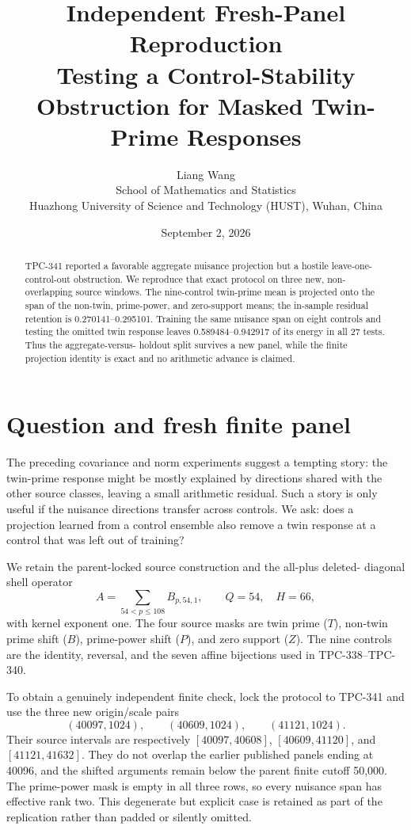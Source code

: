 \documentclass[10pt]{article}
\title{Independent Fresh-Panel Reproduction\\
\large Testing a Control-Stability Obstruction for Masked Twin-Prime Responses}
\author{Liang Wang\\School of Mathematics and Statistics\\
Huazhong University of Science and Technology (HUST), Wuhan, China}
\date{September 2, 2026}
\begin{document}
\maketitle

\begin{abstract}
TPC-341 reported a favorable aggregate nuisance projection but a hostile
leave-one-control-out obstruction.  We reproduce that exact protocol on three
new, non-overlapping source windows.  The nine-control twin-prime mean is
projected onto the span of the non-twin, prime-power, and zero-support means;
the in-sample residual retention is 0.270141--0.295101.  Training the same
nuisance span on eight controls and testing the omitted twin response leaves
0.589484--0.942917 of its energy in all 27 tests.  Thus the aggregate-versus-
holdout split survives a new panel, while the finite projection identity is
exact and no arithmetic advance is claimed.
\end{abstract}

\section{Question and fresh finite panel}

The preceding covariance and norm experiments suggest a tempting story: the
twin-prime response might be mostly explained by directions shared with the
other source classes, leaving a small arithmetic residual.  Such a story is
only useful if the nuisance directions transfer across controls.  We ask:
does a projection learned from a control ensemble also remove a twin response
at a control that was left out of training?

We retain the parent-locked source construction and the all-plus deleted-
diagonal shell operator
\[
 A=\sum_{54<p\leq108}B_{p,54,1},\qquad Q=54,\quad H=66,
\]
with kernel exponent one.  The four source masks are twin prime ($T$),
non-twin prime shift ($B$), prime-power shift ($P$), and zero support ($Z$).
The nine controls are the identity, reversal, and the seven affine bijections
used in TPC-338--TPC-340.

To obtain a genuinely independent finite check, lock the protocol to TPC-341
and use the three new origin/scale pairs
\[
 (40097,1024),\qquad(40609,1024),\qquad(41121,1024).
\]
Their source intervals are respectively
\([40097,40608]\), \([40609,41120]\), and \([41121,41632]\).  They do not
overlap the earlier published panels ending at 40096, and the shifted arguments
remain below the parent finite cutoff 50,000.  The prime-power mask is empty
in all three rows, so every nuisance span has effective rank two.  This
degenerate but explicit case is retained as part of the replication rather
than padded or silently omitted.
\end{document}

